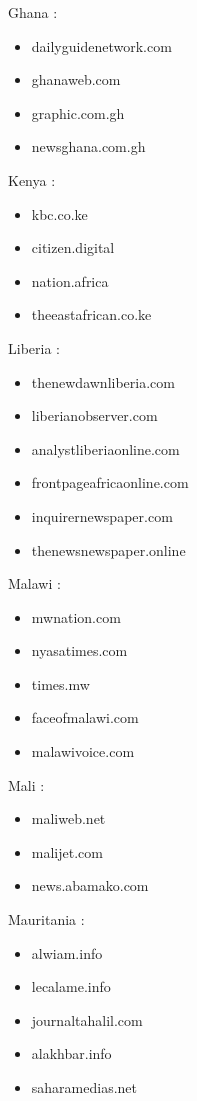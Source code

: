 \documentclass[
  letterpaper,
  DIV=11,
  numbers=noendperiod]{scrartcl}
\providecommand{\tightlist}{%
  \setlength{\itemsep}{0pt}\setlength{\parskip}{0pt}}\usepackage{longtable,booktabs,array}
\begin{document}
Ghana :

\begin{itemize}
\tightlist
\item
  dailyguidenetwork.com
\item
  ghanaweb.com
\item
  graphic.com.gh
\item
  newsghana.com.gh
\end{itemize}

Kenya :

\begin{itemize}
\tightlist
\item
  kbc.co.ke
\item
  citizen.digital
\item
  nation.africa
\item
  theeastafrican.co.ke
\end{itemize}

Liberia :

\begin{itemize}
\tightlist
\item
  thenewdawnliberia.com
\item
  liberianobserver.com
\item
  analystliberiaonline.com
\item
  frontpageafricaonline.com
\item
  inquirernewspaper.com
\item
  thenewsnewspaper.online
\end{itemize}

Malawi :

\begin{itemize}
\tightlist
\item
  mwnation.com
\item
  nyasatimes.com
\item
  times.mw
\item
  faceofmalawi.com
\item
  malawivoice.com
\end{itemize}

Mali :

\begin{itemize}
\tightlist
\item
  maliweb.net
\item
  malijet.com
\item
  news.abamako.com
\end{itemize}

Mauritania :

\begin{itemize}
\tightlist
\item
  alwiam.info
\item
  lecalame.info
\item
  journaltahalil.com
\item
  alakhbar.info
\item
  saharamedias.net
\end{itemize}
\end{document}
